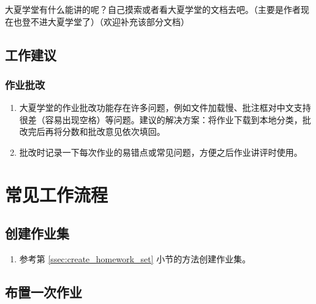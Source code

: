 \documentclass[oneside]{book}
\begin{document}
\label{chap:elearning}


大夏学堂有什么能讲的呢？自己摸索或者看大夏学堂的文档去吧。（主要是作者现在也登不进大夏学堂了）（欢迎补充该部分文档）

\section{工作建议}

\subsection{作业批改}

\begin{enumerate}
  \item 大夏学堂的作业批改功能存在许多问题，例如文件加载慢、批注框对中文支持很差（容易出现空格）等问题。建议的解决方案：将作业下载到本地分类，批改完后再将分数和批改意见依次填回。
  \item 批改时记录一下每次作业的易错点或常见问题，方便之后作业讲评时使用。
\end{enumerate}


\chapter{常见工作流程}

\label{chap:workflow}

\section{创建作业集}

\begin{enumerate}
  \item 参考第 \ref{ssec:create_homework_set} 小节的方法创建作业集。
\end{enumerate}

\section{布置一次作业}

\label{sec:set_homework}
\end{document}
